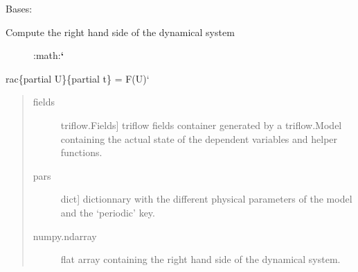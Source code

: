 \documentclass[letterpaper,10pt,english]{sphinxmanual}
\begin{document}
\begin{fulllineitems}
\label{\detokenize{triflow.core:triflow.core.routines.F_Routine}}
Bases: {\hyperref[\detokenize{triflow.core:triflow.core.routines.ModelRoutine}]{}}
\begin{description}
\item[{Compute the right hand side of the dynamical system}] \leavevmode
:math:{\color{red}\bfseries{}{}`}

\end{description}

rac\{partial U\}\{partial t\} = F(U){}`
\begin{quote}
\begin{description}
\item[{fields}] \leavevmode{[}triflow.Fields{]}
triflow fields container generated by a triflow.Model containing the actual state of the dependent variables and helper functions.

\item[{pars}] \leavevmode{[}dict{]}
dictionnary with the different physical parameters of the model and the `periodic' key.

\end{description}
\begin{description}
\item[{numpy.ndarray}] \leavevmode
flat array containing the right hand side of the dynamical system.

\end{description}
\end{quote}

\begin{fulllineitems}
\label{\detokenize{triflow.core:triflow.core.routines.F_Routine.diff_approx}}
\end{fulllineitems}


\end{fulllineitems}

\end{document}
